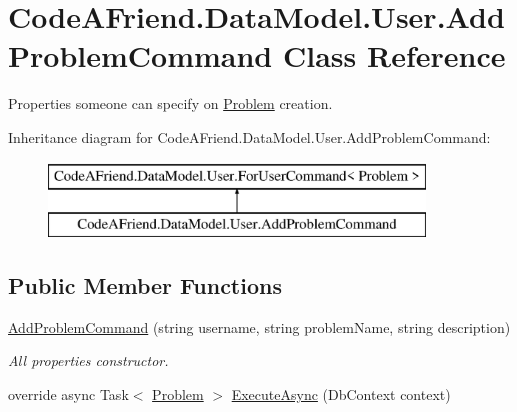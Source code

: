\hypertarget{class_code_a_friend_1_1_data_model_1_1_user_1_1_add_problem_command}{}\section{Code\+A\+Friend.\+Data\+Model.\+User.\+Add\+Problem\+Command Class Reference}
\label{class_code_a_friend_1_1_data_model_1_1_user_1_1_add_problem_command}


Properties someone can specify on \mbox{\hyperlink{class_code_a_friend_1_1_data_model_1_1_problem}{Problem}} creation. 


Inheritance diagram for Code\+A\+Friend.\+Data\+Model.\+User.\+Add\+Problem\+Command\+:\begin{figure}[H]
\begin{center}
\leavevmode
\includegraphics[height=2.000000cm]{class_code_a_friend_1_1_data_model_1_1_user_1_1_add_problem_command}
\end{center}
\end{figure}
\subsection*{Public Member Functions}
\begin{DoxyCompactItemize}
\item 
\mbox{\hyperlink{class_code_a_friend_1_1_data_model_1_1_user_1_1_add_problem_command_ab1882e37c8dc3be58d4ac74f80925407}{Add\+Problem\+Command}} (string username, string problem\+Name, string description)
\begin{DoxyCompactList}\small\item\em All properties constructor.\end{DoxyCompactList}\item 
override async Task$<$ \mbox{\hyperlink{class_code_a_friend_1_1_data_model_1_1_problem}{Problem}} $>$ \mbox{\hyperlink{class_code_a_friend_1_1_data_model_1_1_user_1_1_add_problem_command_a43eff118c9d451d384008fe68559d50d}{Execute\+Async}} (Db\+Context context)
\end{DoxyCompactItemize}
